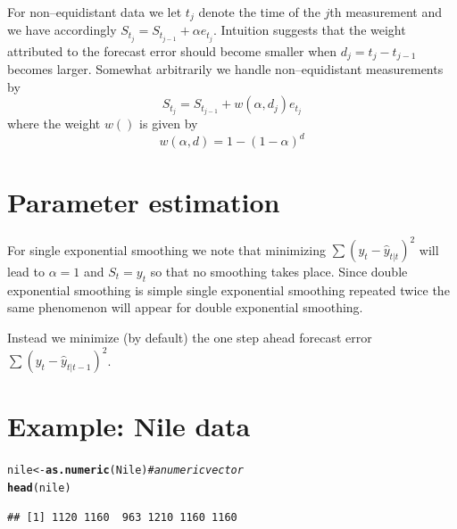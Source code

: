 \documentclass[10pt]{article}\usepackage[]{graphicx}\usepackage[]{color}
\makeatletter
\newcommand{\hlcom}[1]{\textcolor[rgb]{0.678,0.584,0.686}{\textit{#1}}}%
\newcommand{\hlstd}[1]{\textcolor[rgb]{0.345,0.345,0.345}{#1}}%
\newcommand{\hlkwb}[1]{\textcolor[rgb]{0.69,0.353,0.396}{#1}}%
\newcommand{\hlkwd}[1]{\textcolor[rgb]{0.737,0.353,0.396}{\textbf{#1}}}%
\newenvironment{kframe}{%
 \def\at@end@of@kframe{}%
 \ifinner\ifhmode%
  \def\at@end@of@kframe{\end{minipage}}%
  \begin{minipage}{\columnwidth}%
 \fi\fi%
 \def\FrameCommand##1{\hskip\@totalleftmargin \hskip-\fboxsep
 \colorbox{shadecolor}{##1}\hskip-\fboxsep
     \hskip-\linewidth \hskip-\@totalleftmargin \hskip\columnwidth}%
 \MakeFramed {\advance\hsize-\width
   \@totalleftmargin\z@ \linewidth\hsize
   \@setminipage}}%
 {\par\unskip\endMakeFramed%
 \at@end@of@kframe}
\newenvironment{knitrout}{}{} %
\makeatother
\begin{document}
For non--equidistant data we let $t_j$ denote the time of the $j$th
measurement and we have accordingly
$S_{t_j} = S_{t_{j-1}} + \alpha e_{t_j}$. Intuition suggests that the
weight attributed to the forecast error should become smaller when
$d_j = t_j - t_{j-1}$ becomes larger. Somewhat arbitrarily we handle non--equidistant measurements by
\begin{displaymath}
  S_{t_j} = S_{t_{j-1}} + w(\alpha, d_j) e_{t_j}  
\end{displaymath}
where the weight $w()$ is given by
\begin{displaymath}
  w(\alpha, d) = 1 - (1-\alpha)^{d}
\end{displaymath}


\section{Parameter estimation}
\label{sec:parameter-estimation}

For single exponential smoothing we note that minimizing
$\sum (y_t - \hat y_{t|t})^2$ will lead to $\alpha=1$ and $S_t=y_t$ so
that no smoothing takes place. Since double exponential smoothing is
simple single exponential smoothing repeated twice the same phenomenon
will appear for double exponential smoothing.


Instead we minimize (by default) the
one step ahead forecast error $\sum (y_t - \hat y_{t|t-1})^2$.

\section{Example: Nile data}
\label{example:nile}

\begin{knitrout}
\color{fgcolor}\begin{kframe}
\begin{alltt}
\hlstd{nile} \hlkwb{<-} \hlkwd{as.numeric}\hlstd{(Nile)} \hlcom{# a numeric vector}
\hlkwd{head}\hlstd{(nile)}
\end{alltt}
\begin{verbatim}
## [1] 1120 1160  963 1210 1160 1160
\end{verbatim}
\end{kframe}
\end{knitrout}
\end{document}
